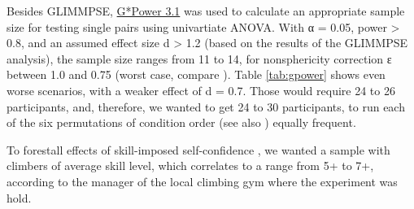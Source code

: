 

Besides GLIMMPSE, \href{http://www.gpower.hhu.de/}{G*Power 3.1} was used to calculate an appropriate sample size for testing single pairs using univartiate \gls{ANOVA}. With α = 0.05, power > 0.8, and an assumed effect size \autocite[cf.][]{Cohen1988} d > 1.2 (based on the results of the GLIMMPSE analysis), the sample size ranges from 11 to 14, for nonsphericity correction ε between 1.0 and 0.75 (worst case, compare \textcite{PowerGuide}). Table \ref{tab:gpower} shows even worse scenarios, with a weaker effect of d = 0.7. Those would require 24 to 26 participants, and, therefore, we wanted to get 24 to 30 participants, to run each of the six permutations of condition order (see also ) equally frequent.

To forestall effects of skill-imposed self-confidence \autocite{Hardy2007}, we wanted a sample with climbers of average skill level, which correlates to a range from 5+ to 7+, according to the manager of the local climbing gym where the experiment was hold.
